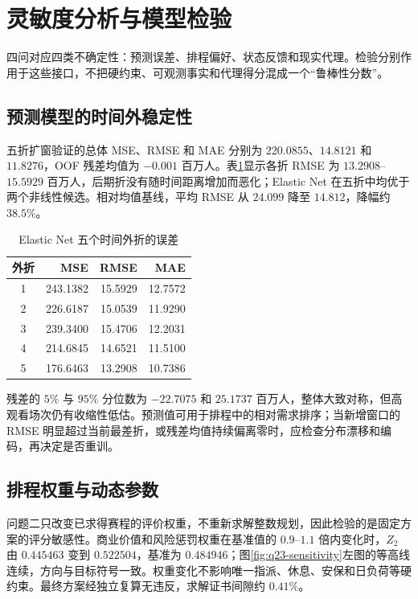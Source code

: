 \section{灵敏度分析与模型检验}\label{sec:sensitivity}

四问对应四类不确定性：预测误差、排程偏好、状态反馈和现实代理。检验分别作用于这些接口，不把硬约束、可观测事实和代理得分混成一个“鲁棒性分数”。

\subsection{预测模型的时间外稳定性}

五折扩窗验证的总体 MSE、RMSE 和 MAE 分别为 $220.0855$、$14.8121$ 和 $11.8276$，OOF 残差均值为 $-0.001$ 百万人。表\ref{tab:q1-fold-stability}显示各折 RMSE 为 $13.2908$--$15.5929$ 百万人，后期折没有随时间距离增加而恶化；Elastic Net 在五折中均优于两个非线性候选。相对均值基线，平均 RMSE 从 $24.099$ 降至 $14.812$，降幅约 $38.5\%$。

{\small
\setlength{\tabcolsep}{8pt}
\begin{table}[htbp]
\centering
\caption{Elastic Net 五个时间外折的误差}
\label{tab:q1-fold-stability}
\begin{tabular}{crrr}
\toprule
外折 & MSE & RMSE & MAE \\
\midrule
1 & 243.1382 & 15.5929 & 12.7572 \\
2 & 226.6187 & 15.0539 & 11.9290 \\
3 & 239.3400 & 15.4706 & 12.2031 \\
4 & 214.6845 & 14.6521 & 11.5100 \\
5 & 176.6463 & 13.2908 & 10.7386 \\
\bottomrule
\end{tabular}
\end{table}
}

残差的 $5\%$ 与 $95\%$ 分位数为 $-22.7075$ 和 $25.1737$ 百万人，整体大致对称，但高观看场次仍有收缩性低估。预测值可用于排程中的相对需求排序；当新增窗口的 RMSE 明显超过当前最差折，或残差均值持续偏离零时，应检查分布漂移和编码，再决定是否重训。

\subsection{排程权重与动态参数}

问题二只改变已求得赛程的评价权重，不重新求解整数规划，因此检验的是固定方案的评分敏感性。商业价值和风险惩罚权重在基准值的 $0.9$--$1.1$ 倍内变化时，$Z_2$ 由 $0.445463$ 变到 $0.522504$，基准为 $0.484946$；图\ref{fig:q23-sensitivity}左图的等高线连续，方向与目标符号一致。权重变化不影响唯一指派、休息、安保和日负荷等硬约束。最终方案经独立复算无违反，求解证书间隙约 $0.41\%$。

